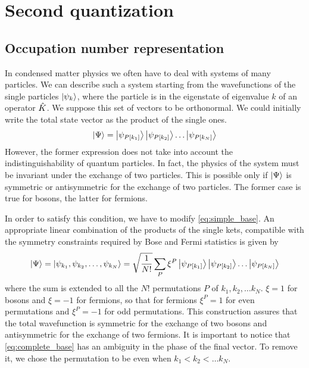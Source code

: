 \section{Second quantization}
\subsection{Occupation number representation}
In condensed matter physics we often have to deal with systems of many particles. We can describe such a system starting from the wavefunctions of the single particles $\ket{\psi_k}$, where the particle is in the eigenstate of eigenvalue $k$ of an operator $\hat{K}$. We suppose this set of vectors to be orthonormal. We could initially write the total state vector as the product of the single ones.
\begin{equation} \label{eq:simple_base}
    \ket{\Psi} = \ket{\psi_{P[k_1]}}\ket{\psi_{P[k_2]}}\dots\ket{\psi_{P[k_N]}}
\end{equation}
However, the former expression does not take into account the indistinguishability of quantum particles. In fact, the physics of the system must be invariant under the exchange of two particles. This is possible only if $\ket{\Psi}$ is symmetric or antisymmetric for the exchange of two particles. The former case is true for bosons, the latter for fermions. %

In order to satisfy this condition, we have to modify \cref{eq:simple_base}. An appropriate linear combination of the products of the single kets, compatible with the symmetry constraints required by Bose and Fermi statistics is given by
\begin{equation} \label{eq:complete_base}
    \ket{\Psi} = \ket{\psi_{k_1}, \psi_{k_2}, \dots, \psi_{k_N}} = \sqrt{\frac{1}{N!}} \sum_P \xi^P \ket{\psi_{P[k_1]}}\ket{\psi_{P[k_2]}}\dots\ket{\psi_{P[k_N]}}
\end{equation}
where the sum is extended to all the $N!$ permutations $P$ of ${k_1, k_2, \dots k_N}$. $\xi = 1$ for bosons and $\xi = -1$ for fermions, so that for fermions $\xi^P = 1$ for even permutations and $\xi^P = -1$ for odd permutations. This construction assures that the total wavefunction is symmetric for the exchange of two bosons and antisymmetric for the exchange of two fermions. It is important to notice that \cref{eq:complete_base} has an ambiguity in the phase of the final vector. To remove it, we chose the permutation to be even when $k_1 < k_2 < \dots k_N$.

